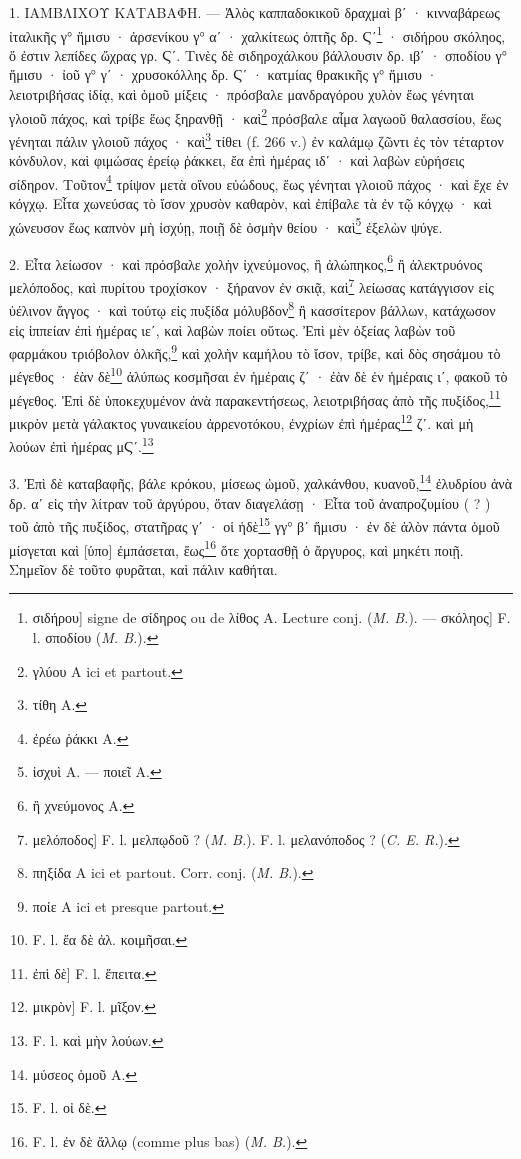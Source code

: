 \documentclass[a4paper, 11pt, oneside, polutonikogreek, french]{article}
\begin{document}
1. ΙΑΜΒΛΙΧΟΥ ΚΑΤΑΒΑΦΗ. --- Ἁλὸς καππαδοκικοῦ δραχμαὶ βʹ · κινναβάρεως ἰταλικῆς γ° ἥμισυ · ἀρσενίκου γ° αʹ · χαλκίτεως ὀπτῆς δρ. Ϛʹ\footnote{σιδήρου] signe de σίδηρος ou de λίθος A. Lecture conj. (\emph{M. B.}). --- σκόληος] F. l. σποδίου (\emph{M. B.}).} · σιδήρου σκόληος, ὅ ἐστιν λεπίδες ὤχρας γρ. Ϛʹ. Τινὲς δὲ σιδηροχάλκου βάλλουσιν δρ. ιβʹ · σποδίου γ° ἥμισυ · ἰοῦ γ° γʹ · χρυσοκόλλης δρ. Ϛʹ · κατμίας θρακικῆς γ° ἥμισυ · λειοτριβήσας ἰδίᾳ, καὶ ὁμοῦ μίξεις · πρόσβαλε μανδραγόρου χυλὸν ἕως γένηται γλοιοῦ πάχος, καὶ τρίβε ἕως ξηρανθῇ · καὶ\footnote{γλύου A ici et partout.} πρόσβαλε αἷμα λαγωοῦ θαλασσίου, ἕως γένηται πάλιν γλοιοῦ πάχος · καὶ\footnote{τίθη A.} τίθει (f. 266 v.) ἐν καλάμῳ ζῶντι ἐς τὸν τέταρτον κόνδυλον, καὶ φιμώσας ἑρείῳ ῥάκκει, ἔα ἐπὶ ἡμέρας ιδʹ · καὶ λαβὼν εὑρήσεις σίδηρον. Τοῦτον\footnote{ἐρέω ῥάκκι A.} τρίψον μετὰ οἴνου εὐώδους, ἕως γένηται γλοιοῦ πάχος · καὶ ἔχε ἐν κόγχῳ. Εἶτα χωνεύσας τὸ ἴσον χρυσὸν καθαρὸν, καὶ ἐπίβαλε τὰ ἐν τῷ κόγχῳ · καὶ χώνευσον ἕως καπνὸν μὴ ἰσχύῃ, ποιῇ δὲ ὀσμὴν θείου · καὶ\footnote{ἰσχυὶ A. --- ποιεῖ A.} ἐξελὼν ψύγε.

2. Εἶτα λείωσον · καὶ πρόσβαλε χολὴν ἰχνεύμονος, ἢ ἀλώπηκος,\footnote{ἢ χνεύμονος A.} ἢ ἀλεκτρυόνος μελόποδος, καὶ πυρίτου τροχίσκον · ξήρανον ἐν σκιᾷ, καὶ\footnote{μελόποδος] F. l. μελπῳδοῦ ? (\emph{M. B.}). F. l. μελανόποδος ? (\emph{C. E. R.}).} λείωσας κατάγγισον εἰς ὑέλινον ἄγγος · καὶ τούτῳ εἰς πυξίδα μόλυβδον\footnote{πηξίδα A ici et partout. Corr. conj. (\emph{M. B.}).} ἢ κασσίτερον βάλλων, κατάχωσον εἰς ἱππείαν ἐπὶ ἡμέρας ιεʹ, καὶ λαβὼν ποίει οὕτως. Ἐπὶ μὲν ὀξείας λαβὼν τοῦ φαρμάκου τριόβολον ὁλκῆς,\footnote{ποίε A ici et presque partout.} καὶ χολὴν καμήλου τὸ ἴσον, τρίβε, καὶ δὸς σησάμου τὸ μέγεθος · ἐὰν δὲ\footnote{F. l. ἔα δὲ ἀλ. κοιμῆσαι.} ἀλύπως κοσμῆσαι ἐν ἡμέραις ζʹ · ἐὰν δὲ ἐν ἡμέραις ιʹ, φακοῦ τὸ μέγεθος. Ἐπὶ δὲ ὑποκεχυμένον ἀνὰ παρακεντήσεως, λειοτριβήσας ἀπὸ τῆς πυξίδος,\footnote{ἐπὶ δὲ] F. l. ἔπειτα.} μικρὸν μετὰ γάλακτος γυναικείου ἀρρενοτόκου, ἐνχρίων ἐπὶ ἡμέρας\footnote{μικρὸν] F. l. μῖξον.} ζʹ. καὶ μὴ λούων ἐπὶ ἠμέρας μϚʹ.\footnote{F. l. καὶ μὴν λούων.}

3. Ἐπὶ δὲ καταβαφῆς, βάλε κρόκου, μίσεως ὠμοῦ, χαλκάνθου, κυανοῦ,\footnote{μύσεος ὁμοῦ A.} ἐλυδρίου ἀνὰ δρ. αʹ εἰς τὴν λίτραν τοῦ ἀργύρου, ὅταν διαγελάσῃ · Εἶτα τοῦ ἀναπροζυμίου ( ? ) τοῦ ἀπὸ τῆς πυξίδος, στατῆρας γʹ · οἱ ἡδὲ\footnote{F. l. οἰ δὲ.} γγ° βʹ ἥμισυ · ἐν δὲ ἀλὸν πάντα ὁμοῦ μίσγεται καὶ [ὑπο] ἐμπάσεται, ἕως\footnote{F. l. ἐν δὲ ἄλλῳ (comme plus bas) (\emph{M. B.}).} ὅτε χορτασθῇ ὁ ἄργυρος, καὶ μηκέτι ποιῇ. Σημεῖον δὲ τοῦτο φυρᾶται, καὶ πάλιν καθήται.
\end{document}
